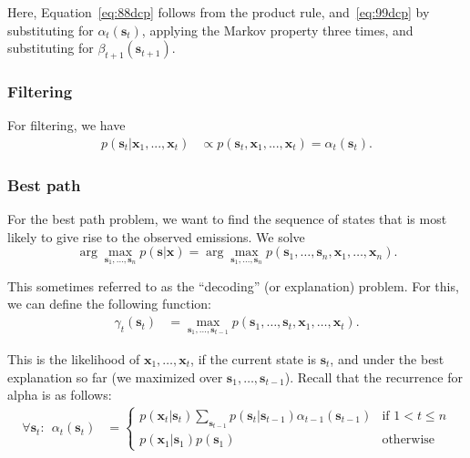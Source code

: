 Here, Equation~\eqref{eq:88dcp} follows from the product rule, and~\eqref{eq:99dcp} by substituting for $\alpha_t(\textbf{s}_t)$, applying the Markov property three times, and substituting for  $\beta_{t+1}(\textbf{s}_{t+1})$.

\subsubsection{Filtering}

For filtering, we have
%
\begin{align}
  p(\textbf{s}_{t} | \textbf{x}_1, ..., \textbf{x}_t) & \propto p(\textbf{s}_{t} , \textbf{x}_1, ..., \textbf{x}_t)= \alpha_t(\textbf{s}_t).
 \end{align}

\subsubsection{Best path}

For the best path problem, we want to find the sequence of states that is most likely to give rise to the observed emissions. We solve
%
$$
\arg\max_{\textbf{s}_1,\ldots,\textbf{s}_n}
p(\textbf{s}|\textbf{x})=\arg\max_{\textbf{s}_1,\ldots,\textbf{s}_n}p(\textbf{s}_1,\ldots,\textbf{s}_n,
\textbf{x}_1,\ldots,\textbf{x}_n).
$$

This sometimes referred to as the ``decoding'' (or explanation) problem. For this, we can define
the following function:
%
\begin{align}
\gamma_t(\textbf{s}_t)&= \max_{\textbf{s}_1,\ldots,\textbf{s}_{t-1}}
p(\textbf{s}_1,\ldots,\textbf{s}_t,\textbf{x}_1,\ldots,\textbf{x}_t).
\end{align}

This is the likelihood of $\textbf{x}_1,\ldots,\textbf{x}_t$, if the current state is $\textbf{s}_t$, and under the best explanation so far (we maximized over $\textbf{s}_1,\dots,\textbf{s}_{t-1}$).
%
Recall that the recurrence for alpha is as follows:
\begin{align*}
\forall \textbf{s}_t:\ \ 
\alpha_t(\textbf{s}_t)&=
\left\{
\begin{array}{ll}
p(\textbf{x}_t| \textbf{s}_t)\sum_{\textbf{s}_{t-1}} p(\textbf{s}_t|\textbf{s}_{t-1})\alpha_{t-1}(\textbf{s}_{t-1}) &\mbox{if $1<t\leq n$}
\\
p(\textbf{x}_1| \textbf{s}_1)p(\textbf{s}_1) &\mbox{otherwise}
\end{array}
\right.
\end{align*}



